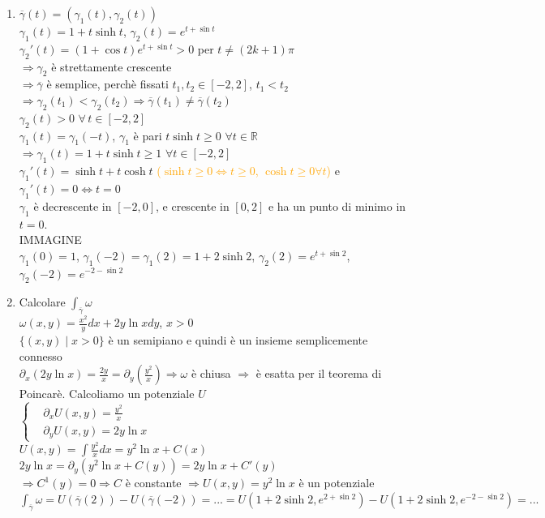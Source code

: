 \documentclass{article}
\newcommand{\R}{\mathbb{R}}
\begin{document}
\begin{enumerate}
    \item $\overline{\gamma}(t)=(\gamma_1(t),\gamma_2(t))$\\
    $\gamma_1(t)=1+t \sinh t$, $\gamma_2 (t)=e^{t+\sin t}$\\
    $\gamma_2' (t)=(1+\cos t) e^{t+\sin t} >0$ per $ t \neq (2k+1)\pi$\\
    $\Rightarrow \gamma_2$ è strettamente crescente\\
    $\Rightarrow \overline{\gamma}$ è semplice, perchè fissati $t_1, t_2 \in [-2,2]$, $t_1< t_2$\\
    $\Rightarrow \gamma_2(t_1)< \gamma_2(t_2)\Rightarrow \overline{\gamma}(t_1)\neq \overline{\gamma}(t_2)$\\
    $\gamma_2 (t)>0$ $\forall \, t \in [-2,2]$\\
    $\gamma_1 (t)= \gamma_1(-t)$, $\gamma_1$ è pari $t\sinh t \geq 0$ $\forall t \in \R$\\
    $\Rightarrow \gamma_1(t)= 1+t \sinh t \geq 1$ $\forall t \in [-2,2]$\\
    $\gamma_1' (t)=\sinh t + t \cosh t$ \textcolor{orange}{($\sinh t \geq 0 \Leftrightarrow t \geq 0$, $\cosh t \geq 0 \forall t$)} e $\gamma_1' (t)=0 \Leftrightarrow t=0$\\
    $\gamma_1$ è decrescente in $[-2,0]$, e crescente in $[0,2]$ e ha un punto di minimo in $t=0$.\\
    IMMAGINE\\
    $\gamma_1(0)=1$, $\gamma_1(-2)=\gamma_1(2)=1+2\sinh 2$, $\gamma_2(2)=e^{t+\sin 2}$, $\gamma_2(-2)=e^{-2-\sin 2}$
    \item Calcolare $\int_{\overline{\gamma}}\omega $\\
    $\omega(x,y)=\frac{x^2}{y}dx+2y \ln x dy$, $x >0$\\
    $\{(x,y)\mid x>0\}$ è un semipiano e quindi è un insieme semplicemente connesso\\
    $\partial_x(2y\ln x)=\frac{2y}{x}=\partial_y (\frac{y^2}{x}) \Rightarrow \omega$ è chiusa $\Rightarrow$ è esatta per il teorema di Poincarè. Calcoliamo un potenziale $U$\\
    $\begin{cases}
        &\partial_x U (x,y)=\frac{y^2}{x}\\
        &\partial_yU(x,y)= 2y\ln x
    \end{cases}$\\
    $U(x,y)=\int \frac{y^2}{x}dx=y^2\ln x + C(x)$\\
    $2y\ln x = \partial_y(y^2\ln x + C(y))=2y\ln x + C'(y)$\\
    $\Rightarrow C^1 (y)=0 \Rightarrow C$ è constante $\Rightarrow U(x,y)=y^2\ln x$ è un potenziale\\
    $\int_{\overline{\gamma}}\omega =U(\overline{\gamma}(2))-U(\overline{\gamma}(-2))=...= U(1+2\sinh 2, e^{2+\sin 2})-U(1+2\sinh 2, e^{-2-\sin 2})=...$
\end{enumerate}
\end{document}
